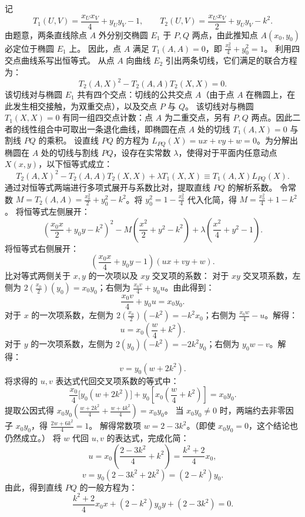 \begin{solution}
记
\[ T_1(U, V) = \frac{x_U x_V}{4} + y_U y_V - 1, \qquad T_2(U, V) = \frac{x_U x_V}{2} + y_U y_V - k^2. \]
由题意，两条直线除点 $A$ 外分别交椭圆 $E_1$ 于 $P, Q$ 两点，由此推知点 $A(x_0, y_0)$ 必定位于椭圆 $E_1$ 上。
因此，点 $A$ 满足 $T_1(A, A) = 0$，即 $\frac{x_0^2}{4} + y_0^2 = 1$。
利用四交点曲线系写出恒等式。
从点 $A$ 向曲线 $E_2$ 引出两条切线，它们满足的联合方程为：
\[ T_2(A, X)^2 - T_2(A, A)T_2(X, X) = 0. \]
该切线对与椭圆 $E_1$ 共有四个交点：切线的公共交点 $A$（由于点 $A$ 在椭圆上，在此发生相交接触，为双重交点），以及交点 $P$ 与 $Q$。
该切线对与椭圆 $T_1(X, X)=0$ 有同一组四交点计数：点 $A$ 为二重交点，另有 $P,Q$ 两点。因此二者的线性组合中可取出一条退化曲线，即椭圆在点 $A$ 处的切线 $T_1(A, X) = 0$ 与割线 $PQ$ 的乘积。
设直线 $PQ$ 的方程为 $L_{PQ}(X) = ux + vy + w = 0$。为分解出椭圆在 $A$ 处的切线与割线 $PQ$，设存在实常数 $\lambda$，使得对于平面内任意动点 $X(x,y)$，以下恒等式成立：
\[ T_2(A, X)^2 - T_2(A, A)T_2(X, X) + \lambda T_1(X, X) \equiv T_1(A, X) L_{PQ}(X). \]
通过对恒等式两端进行多项式展开与系数比对，提取直线 $PQ$ 的解析系数。
令常数 $M = T_2(A, A) = \frac{x_0^2}{2} + y_0^2 - k^2$。将 $y_0^2 = 1 - \frac{x_0^2}{4}$ 代入化简，得 $M = \frac{x_0^2}{4} + 1 - k^2$。
将恒等式左侧展开：
\[ \left(\frac{x_0 x}{2} + y_0 y - k^2\right)^2 - M\left(\frac{x^2}{2} + y^2 - k^2\right) + \lambda\left(\frac{x^2}{4} + y^2 - 1\right). \]
将恒等式右侧展开：
\[ \left(\frac{x_0 x}{4} + y_0 y - 1\right)(ux + vy + w). \]
比对等式两侧关于 $x, y$ 的一次项以及 $xy$ 交叉项的系数：
对于 $xy$ 交叉项系数，左侧为 $2\left(\frac{x_0}{2}\right)(y_0) = x_0 y_0$；右侧为 $\frac{x_0 v}{4} + y_0 u$。由此得到：
\[ \frac{x_0 v}{4} + y_0 u = x_0 y_0. \]
对于 $x$ 的一次项系数，左侧为 $2\left(\frac{x_0}{2}\right)(-k^2) = -k^2 x_0$；右侧为 $\frac{x_0 w}{4} - u$。解得：
\[ u = x_0\left(\frac{w}{4} + k^2\right). \]
对于 $y$ 的一次项系数，左侧为 $2(y_0)(-k^2) = -2k^2 y_0$；右侧为 $y_0 w - v$。解得：
\[ v = y_0(w + 2k^2). \]
将求得的 $u, v$ 表达式代回交叉项系数的等式中：
\[ \frac{x_0}{4}\big[y_0(w + 2k^2)\big] + y_0\left[x_0\left(\frac{w}{4} + k^2\right)\right] = x_0 y_0. \]
提取公因式得 $x_0 y_0 \left( \frac{w + 2k^2}{4} + \frac{w + 4k^2}{4} \right) = x_0 y_0$。
当 $x_0 y_0 \neq 0$ 时，两端约去非零因子 $x_0 y_0$，得 $\frac{2w + 6k^2}{4} = 1$。
解得常数项 $w = 2 - 3k^2$。（即使 $x_0 y_0 = 0$，这个结论也仍然成立。）
将 $w$ 代回 $u, v$ 的表达式，完成化简：
\[ u = x_0\left(\frac{2 - 3k^2}{4} + k^2\right) = \frac{k^2 + 2}{4} x_0, \]
\[ v = y_0(2 - 3k^2 + 2k^2) = (2 - k^2) y_0. \]
由此，得到直线 $PQ$ 的一般方程为：
\[ \frac{k^2 + 2}{4} x_0 x + (2 - k^2) y_0 y + (2 - 3k^2) = 0. \]

\end{solution}
